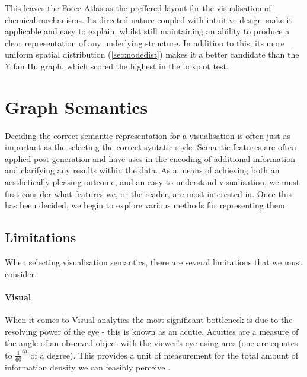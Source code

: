 This leaves the Force Atlas as the preffered layout for the visualisation of chemical mechanisms. Its directed nature coupled with intuitive design make it applicable and easy to explain, whilst still maintaining an ability to produce a clear representation of any underlying structure. In addition to this, its more uniform spatial distribution (\autoref{sec:nodedist}) makes it a better candidate than the Yifan Hu graph, which scored the highest in the boxplot test. 













\section{Graph Semantics}\label{semantic}

Deciding the correct semantic representation for a visualisation is often just as important as the selecting the correct syntatic style. Semantic features are often applied post generation \citep{aestheticsgraphvis} and have uses in the encoding of additional information and clarifying any results within the data. As a means of achieving both an aesthetically pleasing outcome, and an easy to understand visualisation, we must first consider what features we, or the reader, are most interested in. Once this has been decided, we begin to explore various methods for representing them. 

\subsection{Limitations}

When selecting visualisation semantics, there are several limitations that we must consider. 

\paragraph{Visual}
When it comes to Visual analytics the most significant bottleneck is due to the resolving power of the eye - this is known as an acutie. Acuities are a measure of the angle of an observed object with the viewer's eye using arcs (one arc equates to $\frac{1}{60}^{th}$ of a degree). This provides a unit of measurement for the total amount of information density we can feasibly perceive \citep{ware}. 


